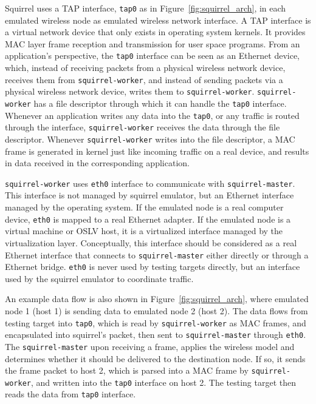 \documentclass[12pt]{report}
\begin{document}
Squirrel uses a TAP\cite{tuntap2002} interface, \texttt{tap0} as in Figure~\ref{fig:squirrel_arch}, in each emulated wireless node as emulated wireless network interface. A TAP interface is a virtual network device that only exists in operating system kernels. It provides MAC layer frame reception and transmission for user space programs. From an application's perspective, the \texttt{tap0} interface can be seen as an Ethernet device, which, instead of receiving packets from a physical wireless network device, receives them from \texttt{squirrel-worker}, and instead of sending packets via a physical wireless network device, writes them to \texttt{squirrel-worker}. \texttt{squirrel-worker} has a file descriptor through which it can handle the \texttt{tap0} interface. Whenever an application writes any data into the \texttt{tap0}, or any traffic is routed through the interface, \texttt{squirrel-worker} receives the data through the file descriptor. Whenever \texttt{squirrel-worker} writes into the file descriptor, a MAC frame is generated in kernel just like incoming traffic on a real device, and results in data received in the corresponding application.

\texttt{squirrel-worker} uses \texttt{eth0} interface to communicate with \texttt{squirrel-master}. This interface is not managed by squirrel emulator, but an Ethernet interface managed by the operating system. If the emulated node is a real computer device, \texttt{eth0} is mapped to a real Ethernet adapter. If the emulated node is a virtual machine or OSLV host, it is a virtualized interface managed by the virtualization layer. Conceptually, this interface should be considered as a real Ethernet interface that connects to \texttt{squirrel-master} either directly or through a Ethernet bridge. \texttt{eth0} is never used by testing targets directly, but an interface used by the squirrel emulator to coordinate traffic.

An example data flow is also shown in Figure~\ref{fig:squirrel_arch}, where emulated node 1 (host 1) is sending data to emulated node 2 (host 2). The data flows from testing target into \texttt{tap0}, which is read by \texttt{squirrel-worker} as MAC frames, and encapsulated into squirrel's packet, then sent to \texttt{squirrel-master} through \texttt{eth0}. The \texttt{squirrel-master} upon receiving a frame, applies the wireless model and determines whether it should be delivered to the destination node. If so, it sends the frame packet to host 2, which is parsed into a MAC frame by \texttt{squirrel-worker}, and written into the \texttt{tap0} interface on host 2. The testing target then reads the data from \texttt{tap0} interface.
\end{document}

